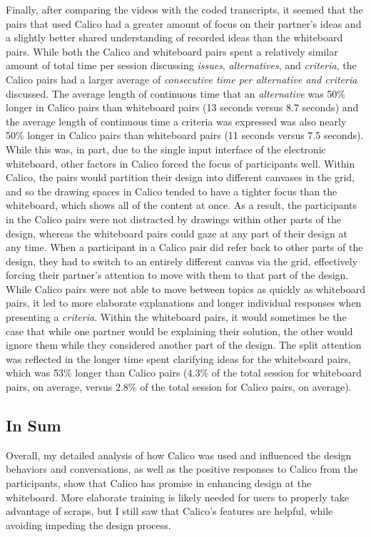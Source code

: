 \documentclass[12pt,fleqn]{ucithesis}
\begin{document}
Finally, after comparing the videos with the coded transcripts, it seemed that the pairs that used Calico had a greater amount of focus on their partner's ideas and a slightly better shared understanding of recorded ideas than the whiteboard pairs. While both the Calico and whiteboard pairs spent a relatively similar amount of total time per session discussing \emph{issues}, \emph{alternatives}, and \emph{criteria}, the Calico pairs had a larger average of \emph{consecutive time per alternative and criteria} discussed. The average length of continuous time that an \emph{alternative} was 50\% longer in Calico pairs than whiteboard pairs (13 seconds versus 8.7 seconds) and the average length of continuous time a criteria was expressed was also nearly 50\% longer in Calico pairs than whiteboard pairs (11 seconds versus 7.5 seconds). While this was, in part, due to the single input interface of the electronic whiteboard, other factors in Calico forced the focus of participants well. Within Calico, the pairs would partition their design into different canvases in the grid, and so the drawing spaces in Calico tended to have a tighter focus than the whiteboard, which shows all of the content at once. As a result, the participants in the Calico pairs were not distracted by drawings within other parts of the design, whereas the whiteboard pairs could gaze at any part of their design at any time. When a participant in a Calico pair did refer back to other parts of the design, they had to switch to an entirely different canvas via the grid, effectively forcing their partner's attention to move with them to that part of the design. While Calico pairs were not able to move between topics as quickly as whiteboard pairs, it led to more elaborate explanations and longer individual responses when presenting a \emph{criteria}. Within the whiteboard pairs, it would sometimes be the case that while one partner would be explaining their solution, the other would ignore them while they considered another part of the design. The split attention was reflected in the longer time spent clarifying ideas for the whiteboard pairs, which was 53\% longer than Calico pairs (4.3\% of the total session for whiteboard pairs, on average, versus 2.8\% of the total session for Calico pairs, on average). 

\subsection {In Sum}
\label{discussion:6}

Overall, my detailed analysis of how Calico was used and influenced the design behaviors and conversations, as well as the positive responses to Calico from the participants, show that Calico has promise in enhancing design at the whiteboard. More elaborate training is likely needed for users to properly take advantage of scraps, but I still saw that Calico's features are helpful, while avoiding impeding the design process. 
\end{document}
